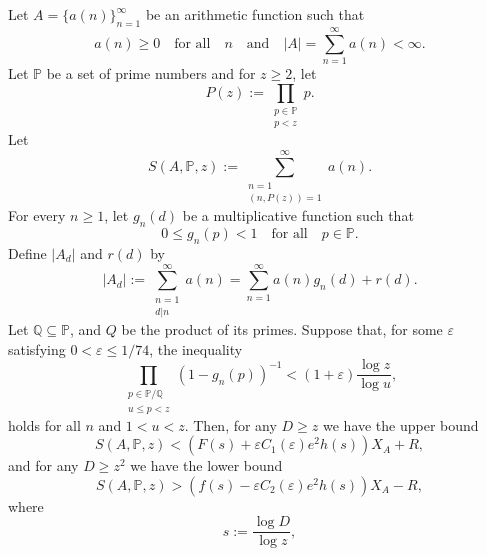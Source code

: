 \documentclass[12pt]{amsart}
\begin{document}
\begin{theorem}
\label{theo:JR}
Let $A=\{a(n)\}_{n=1}^{\infty}$ be an arithmetic function such that
\begin{equation*}
a(n)\ge 0 \quad \text{for all} \quad n \quad \text{and} \quad 
|A|=\sum_{n=1}^{\infty} a(n)< \infty.
\end{equation*}
Let $\mathbb{P}$ be a set of prime numbers and for $z\ge 2$, let
\begin{equation*}
P(z):=\prod_{\substack{p \in \mathbb{P}\\ p<z}}p.
\end{equation*}
Let 
\begin{equation*}
S(A,\mathbb{P}, z):=\sum_{\substack{n=1\\ (n, P(z))=1}}^{\infty}a(n).
\end{equation*}
For every $n\ge 1$, let $g_n(d)$ be a multiplicative function such that
\begin{equation*}
0\le g_n(p)< 1 \quad \text{for all} \quad p \in \mathbb{P}.
\end{equation*}
Define $|A_d|$ and $r(d)$ by
\begin{equation}\label{eq:Adrd}
    |A_d|:=\sum_{\substack{n=1\\ d|n}}^{\infty} a(n)= \sum_{n=1}^{\infty} a(n)g_n(d)+r(d).
\end{equation}
Let $\mathbb{Q}\subseteq \mathbb{P}$, and $Q$ be the product of its primes. Suppose that, for some $\varepsilon$ satisfying $0<\varepsilon\le 1/74$, the inequality
\begin{equation}
\label{eq:cond1}
\prod_{\substack{p\in \mathbb{P}/\mathbb{Q}\\ u \le p < z}}(1-g_n(p))^{-1}<(1+\varepsilon) \frac{\log z}{\log u},
\end{equation}
holds for all $n$ and $1<u<z$. Then, for any $D\ge z$ we have the upper bound
\begin{equation}\label{suppereq}
    S(A,\mathbb{P},z)<(F(s)+\varepsilon C_{1}(\varepsilon) e^2h(s))X_A+R,
\end{equation}
and for any $D\ge z^2$ we have the lower bound
\begin{equation}\label{slowereq}
    S(A,\mathbb{P},z)>(f(s)-\varepsilon C_{2}(\varepsilon) e^2h(s))X_A-R,
\end{equation}
where
\begin{equation*}
s:=\frac{\log D}{\log z},
\end{equation*}
\begin{equation} \label{eq-def-h(s)}

\end{equation}
\end{theorem}
\end{document}
